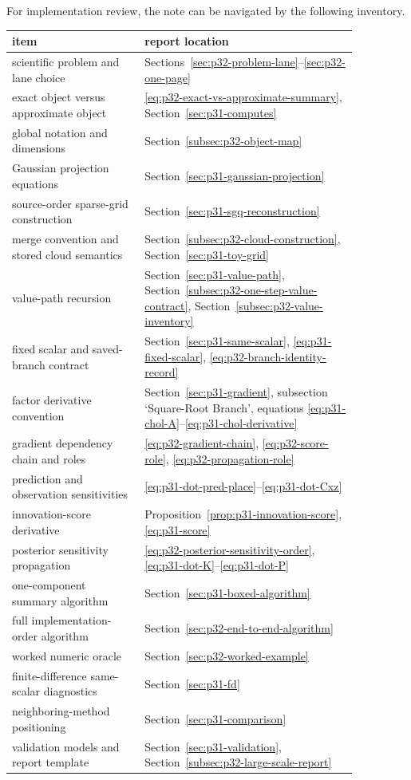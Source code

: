 \documentclass[11pt]{article}
\numberwithin{equation}{section}
\begin{document}
For implementation review, the note can be navigated by the following inventory.
\begin{center}
\small
\begin{tabular}{p{0.33\linewidth}p{0.53\linewidth}}
\toprule
item & report location \\
\midrule
scientific problem and lane choice & Sections~\ref{sec:p32-problem-lane}--\ref{sec:p32-one-page} \\
exact object versus approximate object & \eqref{eq:p32-exact-vs-approximate-summary}, Section~\ref{sec:p31-computes} \\
global notation and dimensions & Section~\ref{subsec:p32-object-map} \\
Gaussian projection equations & Section~\ref{sec:p31-gaussian-projection} \\
source-order sparse-grid construction & Section~\ref{sec:p31-sgq-reconstruction} \\
merge convention and stored cloud semantics & Section~\ref{subsec:p32-cloud-construction}, Section~\ref{sec:p31-toy-grid} \\
value-path recursion & Section~\ref{sec:p31-value-path}, Section~\ref{subsec:p32-one-step-value-contract}, Section~\ref{subsec:p32-value-inventory} \\
fixed scalar and saved-branch contract & Section~\ref{sec:p31-same-scalar}, \eqref{eq:p31-fixed-scalar}, \eqref{eq:p32-branch-identity-record} \\
factor derivative convention & Section~\ref{sec:p31-gradient}, subsection `Square-Root Branch', equations \eqref{eq:p31-chol-A}--\eqref{eq:p31-chol-derivative} \\
gradient dependency chain and roles & \eqref{eq:p32-gradient-chain}, \eqref{eq:p32-score-role}, \eqref{eq:p32-propagation-role} \\
prediction and observation sensitivities & \eqref{eq:p31-dot-pred-place}--\eqref{eq:p31-dot-Cxz} \\
innovation-score derivative & Proposition~\ref{prop:p31-innovation-score}, \eqref{eq:p31-score} \\
posterior sensitivity propagation & \eqref{eq:p32-posterior-sensitivity-order}, \eqref{eq:p31-dot-K}--\eqref{eq:p31-dot-P} \\
one-component summary algorithm & Section~\ref{sec:p31-boxed-algorithm} \\
full implementation-order algorithm & Section~\ref{sec:p32-end-to-end-algorithm} \\
worked numeric oracle & Section~\ref{sec:p32-worked-example} \\
finite-difference same-scalar diagnostics & Section~\ref{sec:p31-fd} \\
neighboring-method positioning & Section~\ref{sec:p31-comparison} \\
validation models and report template & Section~\ref{sec:p31-validation}, Section~\ref{subsec:p32-large-scale-report} \\
\bottomrule
\end{tabular}
\end{center}
\end{document}

